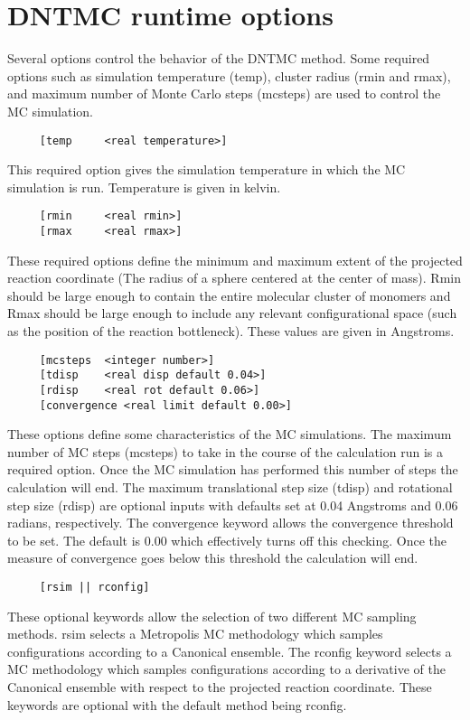 \section{DNTMC runtime options}

Several options control the behavior of the DNTMC method.  Some
required options such as simulation temperature (temp), cluster
radius (rmin and rmax), and maximum number of Monte Carlo steps
(mcsteps) are used to control the MC simulation.

\begin{verbatim}
     [temp     <real temperature>]
\end{verbatim}
This required option gives the simulation temperature in which the
MC simulation is run.  Temperature is given in kelvin.

\begin{verbatim}
     [rmin     <real rmin>]
     [rmax     <real rmax>]
\end{verbatim}
These required options define the minimum and maximum extent of the
projected reaction coordinate (The radius of a sphere centered at
the center of mass).  Rmin should be large enough to contain the
entire molecular cluster of monomers and Rmax should be large enough
to include any relevant configurational space (such as the position
of the reaction bottleneck).  These values are given in Angstroms.

\begin{verbatim}
     [mcsteps  <integer number>]
     [tdisp    <real disp default 0.04>]
     [rdisp    <real rot default 0.06>]
     [convergence <real limit default 0.00>]
\end{verbatim}
These options define some characteristics of the MC simulations. The
maximum number of MC steps (mcsteps) to take in the course of the
calculation run is a required option.  Once the MC simulation has
performed this number of steps the calculation will end.  The
maximum translational step size (tdisp) and rotational step size
(rdisp) are optional inputs with defaults set at 0.04 Angstroms and
0.06 radians, respectively.  The convergence keyword allows the
convergence threshold to be set.  The default is 0.00 which
effectively turns off this checking.  Once the measure of
convergence goes below this threshold the calculation will end.

\begin{verbatim}
     [rsim || rconfig]
\end{verbatim}
These optional keywords allow the selection of two different MC
sampling methods.  rsim selects a Metropolis MC methodology which
samples configurations according to a Canonical ensemble.  The
rconfig keyword selects a MC methodology which samples
configurations according to a derivative of the Canonical ensemble
with respect to the projected reaction coordinate.  These keywords
are optional with the default method being rconfig.

